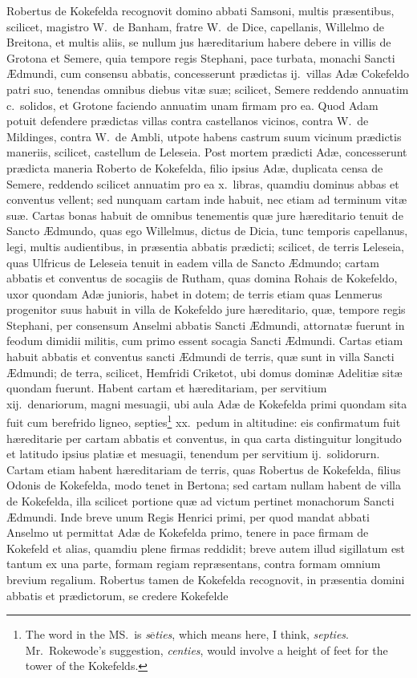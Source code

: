 \documentclass[10pt]{book}
\newcommand{\textoverline}[1]{$\overline{\mbox{#1}}$}
\begin{document}
Robertus de Kokefelda recognovit domino abbati Samsoni, multis pr\ae{}sentibus, scilicet, magistro W.\ de Banham, fratre W.\ de Dice, capellanis, Willelmo de Breitona, et multis aliis, se nullum jus h\ae{}reditarium habere debere in villis de Grotona et Semere, quia tempore regis Stephani, pace turbata, monachi Sancti \AE{}dmundi, cum consensu abbatis, concesserunt pr\ae{}dictas ij.\ villas Ad\ae{} Cokefeldo patri suo, tenendas omnibus diebus vit\ae{} su\ae{}; scilicet, Semere reddendo annuatim c.\ solidos, et Grotone faciendo annuatim unam firmam pro ea. Quod Adam potuit defendere pr\ae{}dictas villas contra castellanos vicinos, contra W.\ de Mildinges, contra W.\ de Ambli, utpote habens castrum suum vicinum pr\ae{}dictis maneriis, scilicet, castellum de Leleseia. Post mortem pr\ae{}dicti Ad\ae{}, concesserunt pr\ae{}dicta maneria Roberto de Kokefelda, filio ipsius Ad\ae{}, duplicata censa de Semere, reddendo scilicet annuatim pro ea x.\ libras, quamdiu dominus abbas et conventus vellent; sed nunquam cartam inde habuit, nec etiam ad terminum vit\ae{} su\ae{}. Cartas bonas habuit de omnibus tenementis qu\ae{} jure h\ae{}reditario tenuit de Sancto \AE{}dmundo, quas ego Willelmus, dictus de Dicia, tunc temporis capellanus, legi, multis audientibus, in pr\ae{}sentia abbatis pr\ae{}dicti; scilicet, de terris Leleseia, quas Ulfricus de Leleseia tenuit in eadem villa de Sancto \AE{}dmundo; cartam abbatis et conventus de socagiis de Rutham, quas domina Rohais de Kokefeldo, uxor quondam Ad\ae{} junioris, habet in dotem; de terris etiam quas Lenmerus progenitor suus habuit in villa de Kokefeldo jure h\ae{}reditario, qu\ae{}, tempore regis Stephani, per consensum Anselmi abbatis Sancti \AE{}dmundi, attornat\ae{} fuerunt in feodum dimidii militis, cum primo essent socagia Sancti \AE{}dmundi. Cartas etiam habuit abbatis et conventus sancti \AE{}dmundi de terris, qu\ae{} sunt in villa Sancti \AE{}dmundi; de terra, scilicet, Hemfridi Criketot, ubi domus domin\ae{} Adeliti\ae{} sit\ae{} quondam fuerunt. Habent cartam et h\ae{}reditariam, per servitium xij.\ denariorum, magni mesuagii, ubi aula Ad\ae{} de Kokefelda primi quondam sita fuit cum berefrido ligneo, septies\footnote[\textdagger]{The word in the MS.\ is \emph{s\textoverline{e}ties}, which means here, I think, \emph{septies}. Mr.\ Rokewode's suggestion, \emph{centies}, would involve a height of  feet for the tower of the Kokefelds.} xx.\ pedum in altitudine: eis confirmatum fuit h\ae{}reditarie per cartam abbatis et conventus, in qua carta distinguitur longitudo et latitudo ipsius plati\ae{} et mesuagii, tenendum per servitium ij.\ solidorurn. Cartam etiam habent h\ae{}reditariam de terris, quas Robertus de Kokefelda, filius Odonis de Kokefelda, modo tenet in Bertona; sed cartam nullam habent de villa de Kokefelda, illa scilicet portione qu\ae{} ad victum pertinet monachorum Sancti \AE{}dmundi. Inde breve unum Regis Henrici primi, per quod mandat abbati Anselmo ut permittat Ad\ae{} de Kokefelda primo, tenere in pace firmam de Kokefeld et alias, quamdiu plene firmas reddidit; breve autem illud sigillatum est tantum ex una parte, formam regiam repr\ae{}sentans, contra formam omnium brevium regalium. Robertus tamen de Kokefelda recognovit, in pr\ae{}sentia domini abbatis et pr\ae{}dictorum,  se credere Kokefelde 
\end{document}
